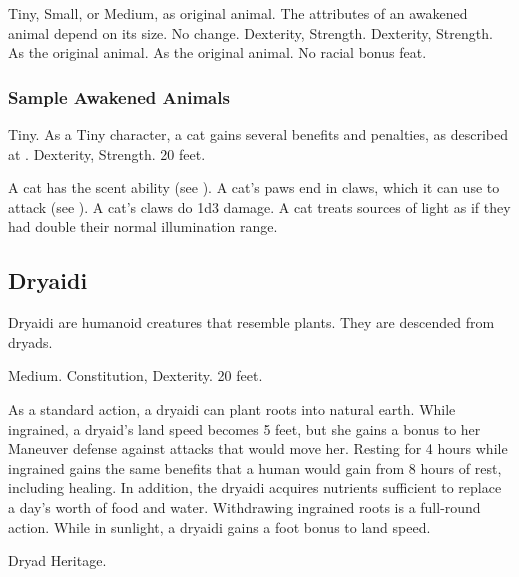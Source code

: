  Tiny, Small, or Medium, as original animal.
 The attributes of an awakened animal depend on its size.
 No change.
  Dexterity,  Strength.
  Dexterity,  Strength.
 As the original animal.
 As the original animal.
 No racial bonus feat.

\subsubsection{Sample Awakened Animals}


 Tiny. As a Tiny character, a cat gains several benefits and penalties, as described at .
  Dexterity,  Strength.
 20 feet.
\begin{itemize}
     A cat has the scent ability (see ).
     A cat's paws end in claws, which it can use to attack (see ). A cat's claws do 1d3 damage.
     A cat treats sources of light as if they had double their normal illumination range.
\end{itemize}

\subsection{Dryaidi}

Dryaidi are humanoid creatures that resemble plants. They are descended from dryads.

 Medium.
  Constitution,  Dexterity.
 20 feet.
\begin{itemize}
     As a standard action, a dryaidi can plant roots into natural earth. While ingrained, a dryaid's land speed becomes 5 feet, but she gains a  bonus to her Maneuver defense against attacks that would move her. Resting for 4 hours while ingrained gains the same benefits that a human would gain from 8 hours of rest, including healing. In addition, the dryaidi acquires nutrients sufficient to replace a day's worth of food and water. Withdrawing ingrained roots is a full-round action.
     While in sunlight, a dryaidi gains a  foot bonus to land speed.
\end{itemize}
 Dryad Heritage.

